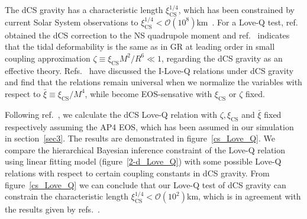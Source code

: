 \documentclass[a4paper,11pt]{article}
\begin{document}

The dCS gravity has a characteristic length $\xi_{\mathrm{CS}}^{1/4}$, which has been constrained by current Solar System observations to $\xi_{\mathrm{CS}}^{1/4}< \mathcal{O}(10^8)$km~\cite{Ali-Haimoud:2011zme, Yagi:2012ya}. For a Love-Q test, ref.~\cite{Yagi:2013mbt} obtained the dCS correction to the NS quadrupole moment and ref.~\cite{Yagi:2011xp} indicates that the tidal deformability is the same as in GR at leading order in small coupling approximation $\zeta \equiv \xi_{\mathrm{CS}} M^2/R^6 \ll 1$, regarding the dCS gravity as an effective theory. Refs.~\cite{Yagi_2017, Yagi:2013mbt} have discussed the I-Love-Q relations under dCS gravity and find that the relations remain universal when we normalize the variables with respect to $\bar{\xi}\equiv \xi_{\mathrm{CS}}/M^4$, while become EOS-sensative with $\xi_{\mathrm{CS}}$ or $\zeta$ fixed. 

Following ref.~\cite{Yagi_2017}, we calculate the dCS Love-Q relation with $\zeta, \xi_{\mathrm{CS}}$ and $\bar{\xi}$ fixed respectively assuming the AP4 EOS, which has been assumed in our simulation in section~\ref{sec3}. The results are demonstrated in figure~\ref{cs_Love_Q}. We compare the hierarchical Bayesian inference constraint of the Love-Q relation using linear fitting model (figure~\ref{2-d_Love_Q}) with some possible Love-Q relations with respect to certain coupling constants in dCS gravity. From figure~\ref{cs_Love_Q} we can conclude that our Love-Q test of dCS gravity can constrain the characteristic length $\xi_{\mathrm{CS}}^{1/4} < \mathcal{O}(10^2)$km, which is in agreement  
with the results given by refs.~\cite{Yagi:2013bca, Yagi:2013awa}.
\end{document}
